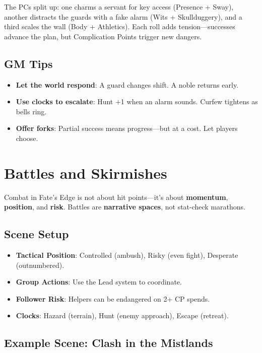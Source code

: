 The PCs split up: one charms a servant for key access (Presence + Sway), another distracts the guards with a fake alarm (Wits + Skullduggery), and a third scales the wall (Body + Athletics). Each roll adds tension—successes advance the plan, but Complication Points trigger new dangers.

\subsection*{GM Tips}

\begin{itemize}
    \item \textbf{Let the world respond}: A guard changes shift. A noble returns early.
    \item \textbf{Use clocks to escalate}: Hunt +1 when an alarm sounds. Curfew tightens as bells ring.
    \item \textbf{Offer forks}: Partial success means progress—but at a cost. Let players choose.
\end{itemize}

\section*{Battles and Skirmishes}

Combat in Fate’s Edge is not about hit points—it’s about \textbf{momentum}, \textbf{position}, and \textbf{risk}. Battles are \textbf{narrative spaces}, not stat-check marathons.

\subsection*{Scene Setup}

\begin{itemize}
    \item \textbf{Tactical Position}: Controlled (ambush), Risky (even fight), Desperate (outnumbered).
    \item \textbf{Group Actions}: Use the Lead system to coordinate.
    \item \textbf{Follower Risk}: Helpers can be endangered on 2+ CP spends.
    \item \textbf{Clocks}: Hazard (terrain), Hunt (enemy approach), Escape (retreat).
\end{itemize}

\subsection*{Example Scene: Clash in the Mistlands}

